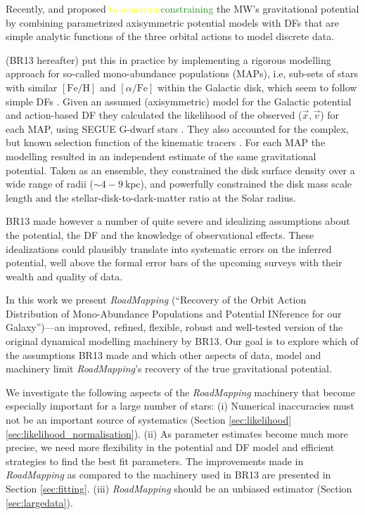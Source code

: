 \documentclass[iop,revtex4,numberedappendix,appendixfloats]{emulateapj}
\newcommand{\MAP}{MAP}
\newcommand{\MAPs}{MAPs}
\newcommand{\RM}{{\sl RoadMapping}}
\newcommand{\NEW}[1]{\textcolor{ForestGreen}{#1}}
\newcommand{\OLD}[1]{\textcolor{Yellow}{#1}}%
\begin{document}
Recently, \citet{2012MNRAS.426.1328B} and \citet{2013ApJ...779..115B} proposed \OLD{to constrain}\NEW{constraining} the MW's gravitational potential by combining parametrized axisymmetric potential models with DFs that are simple analytic functions of the three orbital actions to model discrete data.

\citet{2013ApJ...779..115B} (BR13 hereafter) put this in practice by implementing a rigorous modelling approach for so-called mono-abundance populations (\MAPs{}), i.e, sub-sets of stars with similar $[\mathrm{Fe}/\mathrm{H}]$ and $[\alpha/\mathrm{Fe}]$ within the Galactic disk, which seem to follow simple DFs \citep{2012ApJ...751..131B,2012ApJ...755..115B,2012ApJ...753..148B}. Given an assumed (axisymmetric) model for the Galactic potential and action-based DF \citep{2010MNRAS.401.2318B,2011MNRAS.413.1889B,2013MNRAS.434..652T} they calculated the likelihood of the observed ($\vec{x},\vec{v}$) for each \MAP{}, using SEGUE G-dwarf stars \citep{2009AJ....137.4377Y}. They also accounted for the complex, but known selection function of the kinematic tracers \citep{2012ApJ...753..148B}. For each \MAP{} the modelling resulted in an independent estimate of the same gravitational potential. Taken as an ensemble, they constrained the disk surface density over a wide range of radii ($\sim 4-9~\text{kpc}$), and powerfully constrained the disk mass scale length and the stellar-disk-to-dark-matter ratio at the Solar radius. 

BR13 made however a number of quite severe and idealizing assumptions about the potential, the DF and the knowledge of observational effects. These idealizations could plausibly translate into systematic errors on the inferred potential, well above the formal error bars of the upcoming surveys with their wealth and quality of data.

In this work we present \RM{} (``\textsc{R}ecovery of the \textsc{O}rbit \textsc{A}ction \textsc{D}istribution of \textsc{M}ono-\textsc{A}bundance \textsc{P}opulations and \textsc{P}otential \textsc{IN}ference for our \textsc{G}alaxy'')---an improved, refined, flexible, robust and well-tested version of the original dynamical modelling machinery by BR13. Our goal is to explore which of the assumptions BR13 made and which other aspects of data, model and machinery limit \RM{}'s recovery of the true gravitational potential.

We investigate the following aspects of the \RM{} machinery that become especially important for a large number of stars: (i) Numerical inaccuracies must not be an important source of systematics (Section \OLD{\ref{sec:likelihood}}\NEW{\ref{sec:likelihood_normalisation}}). (ii) As parameter estimates become much more precise, we need more flexibility in the potential and DF model and efficient strategies to find the best fit parameters. The improvements made in \RM{} as compared to the machinery used in BR13 are presented in Section \ref{sec:fitting}. (iii) \RM{} should be an unbiased estimator (Section \ref{sec:largedata}).
\end{document}
